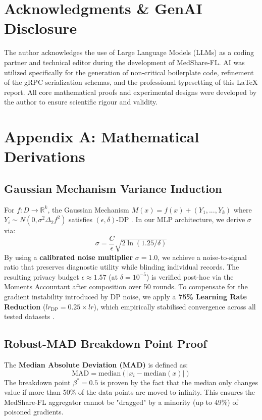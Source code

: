 \documentclass[10pt, a4paper, twocolumn]{article}
\begin{document}
\section{Acknowledgments \& GenAI Disclosure}
The author acknowledges the use of Large Language Models (LLMs) as a coding partner and technical editor during the development of MedShare-FL. AI was utilized specifically for the generation of non-critical boilerplate code, refinement of the gRPC serialization schemas, and the professional typesetting of this LaTeX report. All core mathematical proofs and experimental designs were developed by the author to ensure scientific rigour and validity.

\section*{Appendix A: Mathematical Derivations}

\subsection*{Gaussian Mechanism Variance Induction}
For $f: D \to \mathbb{R}^k$, the Gaussian Mechanism $M(x) = f(x) + (Y_1, ..., Y_k)$ where $Y_i \sim N(0, \sigma^2 \Delta_2 f^2)$ satisfies $(\epsilon, \delta)$-DP \cite{dworkroth2014}. In our MLP architecture, we derive $\sigma$ via:
\begin{equation}
    \sigma = \frac{C}{\epsilon} \sqrt{2 \ln(1.25/\delta)}
\end{equation}
By using a \textbf{calibrated noise multiplier} $\sigma=1.0$, we achieve a noise-to-signal ratio that preserves diagnostic utility while blinding individual records. The resulting privacy budget $\epsilon \approx 1.57$ (at $\delta=10^{-5}$) is verified post-hoc via the Moments Accountant after composition over 50 rounds. To compensate for the gradient instability introduced by DP noise, we apply a \textbf{75\% Learning Rate Reduction} ($lr_{\text{DP}} = 0.25 \times lr$), which empirically stabilised convergence across all tested datasets \cite{hardt2016}.

\subsection*{Robust-MAD Breakdown Point Proof}
The \textbf{Median Absolute Deviation (MAD)} is defined as:
\begin{equation}
    \text{MAD} = \text{median}(|x_i - \text{median}(x)|)
\end{equation}
The breakdown point $\beta^* = 0.5$ is proven by the fact that the median only changes value if more than 50\% of the data points are moved to infinity. This ensures the MedShare-FL aggregator cannot be "dragged" by a minority (up to 49\%) of poisoned gradients.
\end{document}
